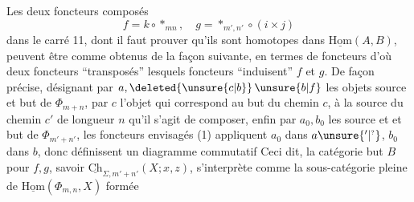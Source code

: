 
Les deux foncteurs composés
\[
f=k\circ *_{mn},\quad g=*_{m',n'}\circ(i\times j)
\]
dans le  carré  11, dont il faut prouver qu'ils sont homotopes\unsure{,} dans $\underline{\mathrm{Hom}}(A,B)$, peuvent être  comme obtenus de la façon suivante, en termes de  foncteurs 
d'où deux foncteurs ``transposés''
lesquels foncteurs ``induisent'' $f$ et $g$. De façon précise, désignant par $a,\deleted{\unsure{c|b}}\,\unsure{b|f}$ les objets source et but de $\Phi_{m+n}$, par $c$ l'objet qui correspond au but du chemin $c$,  à la source du chemin $c'$ de longueur $n$ qu'il s'agit de composer, enfin par $a_0,b_0$ les  source et et but de $\Phi_{m'+n'}$, les foncteurs envisagés (1) appliquent $a_0$ dans $a\unsure{{}^{\prime}|{}^{\scriptscriptstyle ?}}$, $b_0$ dans $b$, donc définissent  un diagramme commutatif
Ceci dit, la catégorie but $B$ pour $f,g$, savoir $\underline{\mathrm{Ch}}_{\Sigma,m'+n'}(X;x,z)$, s'interprète comme la sous-catégorie pleine de $\underline{\mathrm{Hom}}(\Phi_{m,n},X)$  formée

